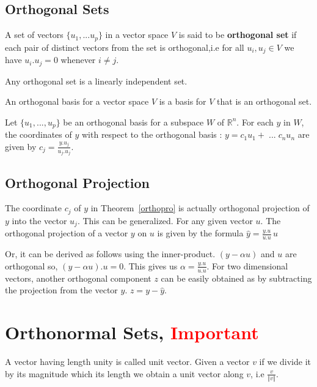 \documentclass[aima104_lecturenotes_ku.tex]{subfiles}
\begin{document}
\subsection{Orthogonal Sets}
A set of vectors $\{ u_1, ...u_p\}$ in a vector space $V$ is said to be \textbf{orthogonal set} if each pair of distinct vectors from the set is orthogonal,i.e for all $u_i, u_j \in V$ we have $u_i.u_j = 0$ whenever $i \neq j$.
\setcounter{theorem}{2}
\begin{mdframed}
\begin{theorem}
  Any orthogonal set is a linearly independent set.
\end{theorem}
\begin{definition}
  An orthogonal basis for a vector space $V$ is a basis for $V$ that is an orthogonal set.
\end{definition}
\begin{theorem}
  \label{orthopro}
  Let $\{u_1, ..., u_p\}$ be an orthogonal basis for a subspace $W$ of $\mathbb{R}^n$. For each $y$ in $W$, the coordinates of $y$ with respect to the orthogonal basis : $y = c_1u_1 + \; ... \; c_n u_n$ are given by $\displaystyle c_j = \frac{y.u_j}{u_j.u_j}$.
\end{theorem}
\end{mdframed}

\subsection{Orthogonal Projection}
The coordinate $c_j$ of $y$ in Theorem~\ref{orthopro} is actually orthogonal projection of $y$ into the vector $u_j$. This can be generalized. For any given vector $u$. The orthogonal projection of a vector $y$ on $u$ is given by the formula $\displaystyle \hat{y} = \frac{y.u}{u.u}\, u$

Or, it can be derived as follows using the inner-product. $(y-\alpha u)$ and $u$ are orthogonal so, $(y-\alpha u).u=0$. This gives us $\displaystyle \alpha = \frac{y.u}{u.u}$. For two dimensional vectors, another orthogonal component $z$ can be easily obtained as by subtracting the projection from the vector $y$. $z = y - \hat{y}$.

\section{Orthonormal Sets, {\mdseries \small \textcolor{red}{Important}}}
\begin{remark}
  A vector having length unity is called unit vector. Given a vector $v$ if we divide it by its magnitude which its length we obtain a unit vector along $v$, i.e $\displaystyle \frac{v}{\Vert v \Vert}$.
\end{remark}
\end{document}
